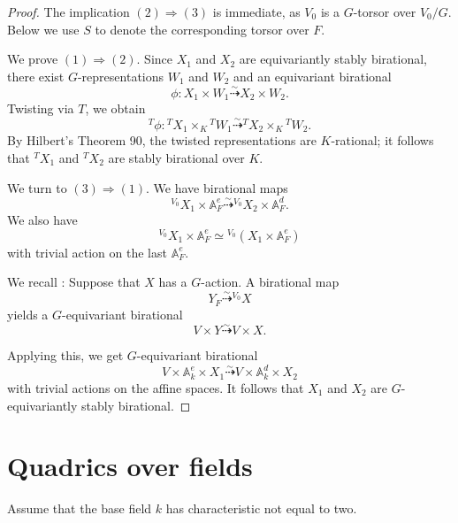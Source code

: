 \documentclass[12pt]{amsart}
\numberwithin{equation}{section}
\newcommand{\bA}{\mathbb{A}}
\theoremstyle{plain}
\theoremstyle{definition}
\theoremstyle{remark}
\begin{document}
\begin{proof}  
The implication $(2) \Rightarrow (3)$ is immediate,
as $V_0$ is a $G$-torsor over $V_0/G$. 
Below we use $S$ to denote the corresponding torsor
over $F$.



We prove $(1) \Rightarrow (2)$.  
Since $X_1$ and $X_2$ are equivariantly stably
birational, there exist $G$-representations $W_1$ and $W_2$
and an equivariant birational
$$\phi: X_1 \times W_1 \stackrel{\sim}{\dashrightarrow}
X_2 \times W_2.$$
Twisting via $T$, we obtain
$${ }^T\phi: { }^TX_1 \times_K { }^TW_1 
\stackrel{\sim}{\dashrightarrow} { }^TX_2 \times_K { }^TW_2.$$
By Hilbert's Theorem 90, the twisted representations
are $K$-rational; it follows that ${ }^TX_1$ and ${ }^TX_2$
are stably birational over $K$.

We turn to $(3) \Rightarrow (1)$.  We have birational maps
$$
{ }^{V_0} X_1 \times \bA^e_F \stackrel{\sim}{\dashrightarrow}
{ }^{V_0}X_2 \times \bA^d_F.
$$
We also have
$${ }^{V_0} X_1 \times \bA^e_F \simeq { }^{V_0}(X_1 \times \bA^e_F)
$$
with trivial action on the last $\bA^e_F$.  

We recall \cite[Lem.~5.1]{DR}: Suppose that $X$ has a $G$-action. A birational map
$$
Y_F \stackrel{\sim}{\dashrightarrow} { }^{V_0}X 
$$
yields a $G$-equivariant birational 
$$V \times Y \stackrel{\sim}{\dashrightarrow} V \times X.
$$

Applying this, we get $G$-equivariant birational
$$V \times \bA^e_k \times X_1 
\stackrel{\sim}{\dashrightarrow}
V \times \bA^d_k \times X_2$$
with trivial actions on the affine spaces.  
It follows that $X_1$ and $X_2$ are $G$-equivariantly stably birational.
\end{proof}






\section{Quadrics over fields}
\label{sect:quad}

Assume that the base field $k$ has characteristic not equal to two.
\end{document}
